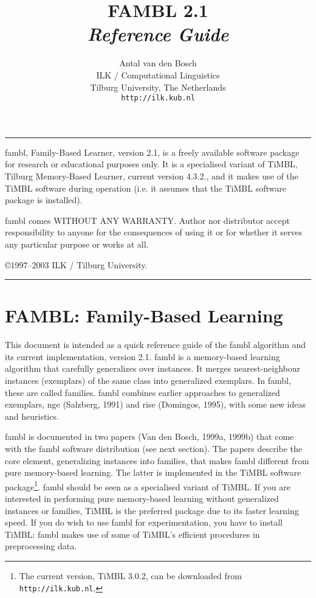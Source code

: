 \documentclass[11pt]{article}
\begin{document}
\title{FAMBL 2.1 \\ {\sl Reference Guide}}
\author{Antal van den Bosch \\ ILK / Computational Linguistics \\
Tilburg University, The Netherlands \\ {\tt http://ilk.kub.nl} }

\maketitle

\vspace*{6cm}

\rule{\textwidth}{1.0mm}

{\sc fambl}, Family-Based Learner, version 2.1, is a freely available
software package for research or educational purposes only. It is a
specialised variant of TiMBL, Tilburg Memory-Based Learner, current
version 4.3.2., and it makes use of the TiMBL software during
operation (i.e. it assumes that the TiMBL software package is
installed).

{\sc fambl} comes WITHOUT ANY WARRANTY. Author nor distributor accept
responsibility to anyone for the consequences of using it or for
whether it serves any particular purpose or works at all.

\copyright 1997--2003 ILK / Tilburg University.

\rule{\textwidth}{0.5mm}

\clearpage

\section{FAMBL: Family-Based Learning}

This document is intended as a quick reference guide of the {\sc
fambl} algorithm and its current implementation, version 2.1. {\sc
fambl} is a memory-based learning algorithm that carefully generalizes
over instances. It merges nearest-neighbour instances (exemplars) of
the same class into generalized exemplars. In {\sc fambl}, these are
called families. {\sc fambl} combines earlier approaches to
generalized exemplars, {\sc nge} (Salzberg, 1991) and {\sc rise}
(Domingos, 1995), with some new ideas and heuristics.

{\sc fambl} is documented in two papers (Van den Bosch, 1999a, 1999b)
that come with the {\sc fambl} software distribution (see next
section). The papers describe the core element, generalizing instances
into families, that makes {\sc fambl} different from pure memory-based
learning. The latter is implemented in the TiMBL software
package\footnote{The current version, TiMBL 3.0.2, can be downloaded
from {\tt http://ilk.kub.nl}.}. {\sc fambl} should be seen as a
specialised variant of TiMBL. If you are interested in performing pure
memory-based learning without generalized instances or families, TiMBL
is the preferred package due to its faster learning speed. If you do
wish to use {\sc fambl} for experimentation, you have to install
TiMBL: {\sc fambl} makes use of some of TiMBL's efficient procedures
in preprocessing data.
\end{document}
